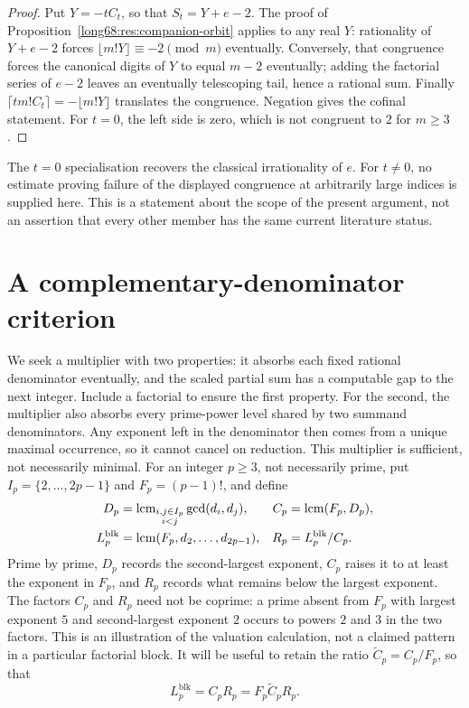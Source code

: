 \documentclass[11pt]{article}
\newcommand{\Ser}{S}
\newcommand{\Lc}{L}
\begin{document}
\begin{proof}
Put $Y=-tC_t$, so that $\Ser_t=Y+e-2$.  The proof of
Proposition~\ref{long68:res:companion-orbit} applies to any real $Y$:
rationality of $Y+e-2$ forces
$\lfloor m!Y\rfloor\equiv-2\pmod m$ eventually.  Conversely, that congruence
forces the canonical digits of $Y$ to equal $m-2$ eventually; adding the
factorial series of $e-2$ leaves an eventually telescoping tail, hence a
rational sum.  Finally
$\lceil t m!C_t\rceil=-\lfloor m!Y\rfloor$ translates the congruence.
Negation gives the cofinal statement.  For $t=0$, the left side is zero,
which is not congruent to $2$ for $m\ge3$.
\end{proof}

The $t=0$ specialisation recovers the classical irrationality of $e$.
For $t\ne0$, no estimate proving failure of the displayed congruence at
arbitrarily large indices is supplied here.
This is a statement about the scope of the present argument, not an assertion
that every other member has the same current literature status.

\section{A complementary-denominator criterion}\label{long68:sec:residue}

We seek a multiplier with two properties: it absorbs each fixed
rational denominator eventually, and the scaled partial sum has a
computable gap to the next integer. Include a factorial to ensure the
first property. For the second, the multiplier also absorbs every prime-power
level shared by two summand denominators. Any exponent left in the
denominator then comes from a unique maximal occurrence, so it
cannot cancel on reduction. This multiplier
is sufficient, not necessarily minimal. For an integer $p\ge3$, not
necessarily prime, put
$I_p=\{2,\ldots,2p-1\}$ and $F_p=(p-1)!$, and define
\begin{align*}
 D_p&=\lcm_{\substack{i,j\in I_p\\ i<j}}\gcd(d_i,d_j),
 &C_p&=\lcm(F_p,D_p),\\
 \Lc^{\mathrm{blk}}_p&=\lcm(F_p,d_2,\ldots,d_{2p-1}),
 &R_p&=\Lc^{\mathrm{blk}}_p/C_p .
\end{align*}
Prime by prime, $D_p$ records the second-largest exponent, $C_p$
raises it to at least the exponent in $F_p$, and $R_p$ records what
remains below the largest exponent.
The factors $C_p$ and $R_p$ need not be coprime: a prime absent from $F_p$
with largest exponent $5$ and second-largest exponent $2$ occurs to powers
$2$ and $3$ in the two factors. This is an illustration of the valuation
calculation, not a claimed pattern in a particular factorial block.
It will be useful to retain the ratio $\widetilde C_p=C_p/F_p$, so that
\begin{equation}\label{long68:eq:core-normalisation}
 \Lc^{\mathrm{blk}}_p=C_pR_p=F_p\widetilde C_pR_p .
\end{equation}
\end{document}

